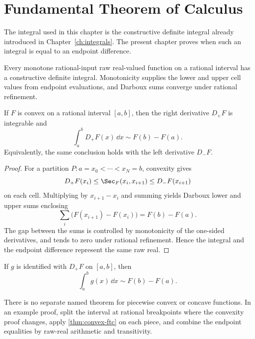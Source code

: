 \section{Fundamental Theorem of Calculus}

The integral used in this chapter is the constructive definite integral
already introduced in Chapter~\ref{ch:integrals}.  The present chapter proves
when such an integral is equal to an endpoint difference.

\begin{theorem}
\label{thm:monotone-integrable}
Every monotone rational-input raw real-valued function on a rational interval
has a constructive definite integral.  Monotonicity supplies the lower and
upper cell values from endpoint evaluations, and Darboux sums converge under
rational refinement.
\end{theorem}

\begin{theorem}\label{thm:convex-ftc}
If \(F\) is convex on a rational interval \([a,b]\), then the right
derivative \(D_+F\) is integrable and
\[
  \int_a^b D_+F(x)\,\dd x \sim F(b)-F(a).
\]
Equivalently, the same conclusion holds with the left derivative \(D_-F\).
\end{theorem}

\begin{proof}
For a partition \(P:a=x_0<\cdots<x_N=b\), convexity gives
\[
  D_+F(x_i)
  \le
  \Sec_F(x_i,x_{i+1})
  \le
  D_-F(x_{i+1})
\]
on each cell.  Multiplying by \(x_{i+1}-x_i\) and summing yields Darboux
lower and upper sums enclosing
\[
  \sum_i \bigl(F(x_{i+1})-F(x_i)\bigr)=F(b)-F(a).
\]
The gap between the sums is controlled by monotonicity of the one-sided
derivatives, and tends to zero under rational refinement.  Hence the integral
and the endpoint difference represent the same raw real.
\end{proof}

\begin{theorem}
\label{thm:formula-identification-ftc}
If \(g\) is identified with \(D_+F\) on \([a,b]\), then
\[
  \int_a^b g(x)\,\dd x \sim F(b)-F(a).
\]
\end{theorem}

\begin{remark}\label{rem:no-piecewise-ftc}
There is no separate named theorem for piecewise convex or concave functions.
In an example proof, split the interval at rational breakpoints where the
convexity proof changes, apply \cref{thm:convex-ftc} on each piece, and
combine the endpoint equalities by raw-real arithmetic and transitivity.
\end{remark}

